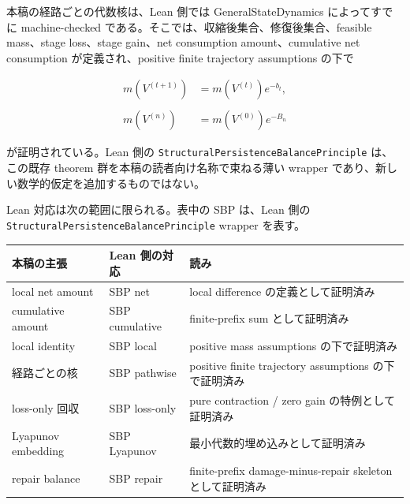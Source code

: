 \documentclass[12pt,a4paper]{article}
\begin{document}
本稿の経路ごとの代数核は、Lean 側では GeneralStateDynamics によってすでに machine-checked である。そこでは、収縮後集合、修復後集合、feasible mass、stage loss、stage gain、net consumption amount、cumulative net consumption が定義され、positive finite trajectory assumptions の下で

\[
\begin{aligned}
m(V^{(t+1)})&=m(V^{(t)})e^{-b_{t}}, \\
\qquad \\
m(V^{(n)})&=m(V^{(0)})e^{-B_{n}}
\end{aligned}
\]

が証明されている。Lean 側の \texttt{StructuralPersistenceBalancePrinciple} は、この既存 theorem 群を本稿の読者向け名称で束ねる薄い wrapper であり、新しい数学的仮定を追加するものではない。

Lean 対応は次の範囲に限られる。表中の SBP は、Lean 側の \texttt{StructuralPersistenceBalancePrinciple} wrapper を表す。

{\def\LTcaptype{table} %
\begin{longtable}[]{@{}
  >{\raggedright\arraybackslash}p{}
  >{\raggedright\arraybackslash}p{}
  >{\raggedright\arraybackslash}p{}@{}}
\toprule\noalign{}
\begin{minipage}[b]{\linewidth}\raggedright
本稿の主張
\end{minipage} & \begin{minipage}[b]{\linewidth}\raggedright
Lean 側の対応
\end{minipage} & \begin{minipage}[b]{\linewidth}\raggedright
読み
\end{minipage} \\
\midrule\noalign{}
\endhead
\bottomrule\noalign{}
\endlastfoot
local net amount & SBP net & local difference の定義として証明済み \\
cumulative amount & SBP cumulative & finite-prefix sum として証明済み \\
local identity & SBP local & positive mass assumptions の下で証明済み \\
経路ごとの核 & SBP pathwise & positive finite trajectory assumptions の下で証明済み \\
loss-only 回収 & SBP loss-only & pure contraction / zero gain の特例として証明済み \\
Lyapunov embedding & SBP Lyapunov & 最小代数的埋め込みとして証明済み \\
repair balance & SBP repair & finite-prefix damage-minus-repair skeleton として証明済み \\
\end{longtable}
}
\end{document}
